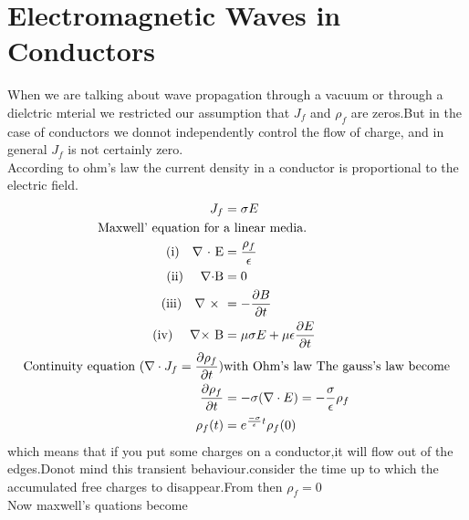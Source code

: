 \section{Electromagnetic Waves in Conductors}
When we are talking about wave propagation through a vacuum or through a dielctric mterial we restricted our assumption that $J_f$ and $\rho_f$ are zeros.But in the case of conductors we donnot independently control the flow of charge, and in general $J_f$ is not certainly zero.\\
According to ohm's law the current density in a conductor is proportional to the electric field.
\begin{align*}
J_f&=\sigma E\\
\text{Maxwell' equation for }&\text{a linear media.}\\
\text{(i)\quad $\nabla$ $\cdot$ E}&=\frac{\rho_f}{\epsilon}\\
\text{(ii) \quad $\nabla \cdot $B}&=0\\
\text{(iii)\quad $\nabla$ $\times$ }&=-\frac{\partial B}{\partial t}\\
\text{(iv) \quad $\nabla \times$ B}&=\mu \sigma E+\mu \epsilon \frac{\partial E}{\partial t}\\
\text{Continuity equation ($\nabla \cdot J_f=\frac{\partial \rho_f}{\partial t}$)}& \text{with Ohm's law The gauss's law become}\\
\frac{\partial \rho_f}{\partial t}&=-\sigma (\nabla \cdot E)=-\frac{\sigma}{\epsilon}\rho_f\\
\rho_f(t)&=e^{\frac{-\sigma}{\epsilon}t} \rho_f(0)
\end{align*}
which means that if you put some charges on a conductor,it will flow out of the edges.Donot mind this transient behaviour.consider the time up to which the accumulated free charges to disappear.From then $\rho_f=0$\\
Now maxwell's quations become
